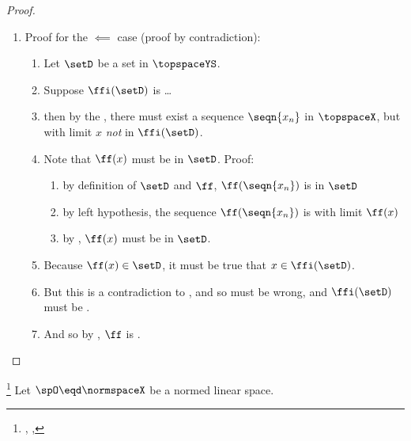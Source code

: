 \begin{proof}
\begin{enumerate}
  \item Proof for the $\impliedby$ case (proof by contradiction):
    \begin{enumerate}
      \item Let $\setD$ be a  set in $\topspaceYS$.
      \item Suppose $\ffi(\setD)$ is \ldots \label{item:limcont_suppose}
      \item then by the  , there must exist 
            a  sequence $\seqn{x_n}$ in $\topspaceX$, 
            but with limit $x$ \emph{not} in $\ffi(\setD)$. \label{item:limcont_x}
      \item Note that $\ff(x)$ must be in $\setD$. Proof:
        \begin{enumerate}
          \item by definition of $\setD$ and $\ff$, $\ff(\seqn{x_n})$ is in $\setD$
          \item by left hypothesis, the sequence $\ff(\seqn{x_n})$ is  with limit $\ff(x)$
          \item by  , $\ff(x)$ must be in $\setD$.
        \end{enumerate}
      \item Because $\ff(x)\in\setD$, it must be true that $x\in\ffi(\setD)$.
      \item But this is a contradiction to , 
            and so  must be wrong, and $\ffi(\setD)$ must be .
      \item And so by , $\ff$ is .
    \end{enumerate}
  \end{enumerate}
\end{proof}





\begin{definition}
\footnote{
  ,
  ,
  }
\label{def:banach}
Let $\spO\eqd\normspaceX$ be a normed linear space.
\end{definition}

